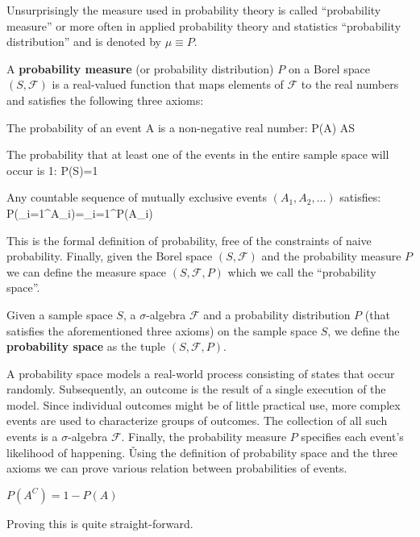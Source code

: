 Unsurprisingly the measure used in probability theory is called ``probability measure'' or more often in applied
probability theory and statistics ``probability distribution'' and is denoted by $\mu \equiv P$.

A \textbf{probability measure} (or probability distribution) $P$ on a Borel space $(S, \mathcal{F})$ is a real-valued
function that maps elements of $\mathcal{F}$ to the real numbers and satisfies the following three axioms:
\ben
\item The probability of an event A is a non-negative real number:
\bse
P(A) \qquad \forall A\in S
\ese

\item The probability that at least one of the events in the entire sample space will occur is 1:
\bse
P(S)=1
\ese

\item Any countable sequence of mutually exclusive events $(A_{1}, A_{2}, \ldots)$ satisfies:
\bse
P\left(\bigcup _{i=1}^{\infty }A_{i}\right)=\sum _{i=1}^{\infty }P(A_{i})
\ese
\een
\ed

This is the formal definition of probability, free of the constraints of naive probability. Finally, given the Borel
space $(S, \mathcal{F})$ and the probability measure $P$ we can define the measure space $(S, \mathcal{F}, P)$ which
we call the ``probability space''.

Given a sample space $S$, a $\sigma$-algebra $\mathcal{F}$ and a probability distribution $P$ (that satisfies the
aforementioned three axioms) on the sample space $S$, we define the \textbf{probability space} as the tuple $(S,
\mathcal{F}, P)$.
\ed

A probability space models a real-world process consisting of states that occur randomly. Subsequently, an outcome is
the result of a single execution of the model. Since individual outcomes might be of little practical use, more
complex events are used to characterize groups of outcomes. The collection of all such events is a $\sigma$-algebra
$\mathcal{F}$. Finally, the probability measure $P$ specifies each event's likelihood of happening. \v

Using the definition of probability space and the three axioms we can prove various relation between probabilities of
events.

\bt[]
$P(A^{C}) = 1 - P(A)$
\et

Proving this is quite straight-forward.

